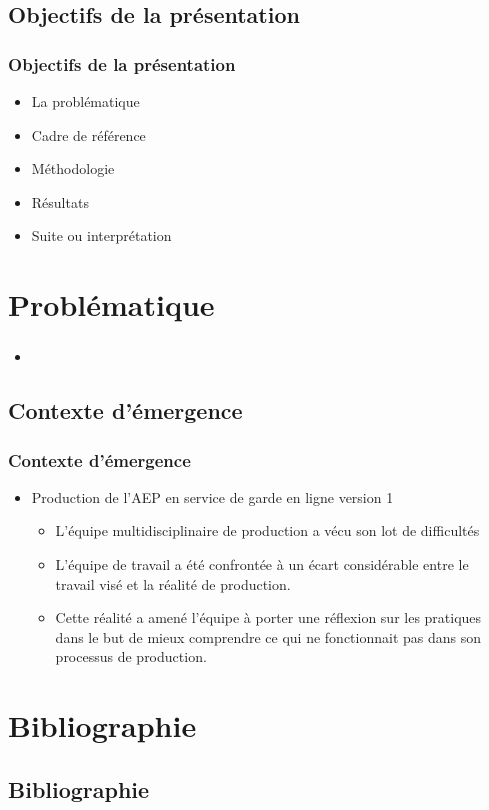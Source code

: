             \subsection{Objectifs de la présentation} 
		\begin{frame}[allowframebreaks]
			\frametitle{Objectifs de la présentation}
			\begin {itemize}
				
                                \item La problématique
                                \item Cadre de référence
                                \item Méthodologie
                                \item Résultats
                                \item Suite ou interprétation
                        \end{itemize}
		\end{frame}

               \section{Problématique} 
		\begin{frame}[allowframebreaks]
			\frametitle{}
			\begin{itemize}
				\item 
			\end{itemize}
		\end{frame}

               \subsection{Contexte d'émergence} 
		\begin{frame}[allowframebreaks]
			\frametitle{Contexte d'émergence}
			\begin{itemize}
				\item Production de l'AEP en service de garde en ligne version 1
                                  \begin{itemize}
                                    \item L’équipe multidisciplinaire de production a vécu son lot de difficultés
                                    \item L’équipe de travail a été confrontée à un écart considérable entre le travail visé et la réalité de production.
                                    \item Cette réalité a amené l’équipe à porter une réflexion sur les pratiques dans le but de mieux comprendre ce qui ne fonctionnait pas dans son processus de production.
                                  \end{itemize}
			\end{itemize} 
		\end{frame}

\section{Bibliographie}
\subsection{Bibliographie}


